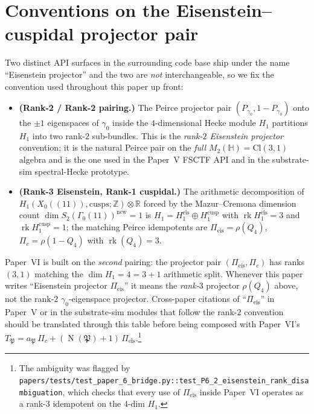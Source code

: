 \documentclass[11pt,a4paper]{article}
\theoremstyle{plain}
\theoremstyle{definition}
\theoremstyle{remark}
\numberwithin{equation}{section}
\providecommand{\Cl}{\mathrm{Cl}}
\providecommand{\HH}{\mathbb{H}}
\providecommand{\ZZ}{\mathbb{Z}}
\providecommand{\RR}{\mathbb{R}}
\providecommand{\fP}{\mathfrak{P}}
\DeclareMathOperator{\Nm}{N}
\DeclareMathOperator{\rk}{rk}
\begin{document}
\section*{Conventions on the Eisenstein--cuspidal projector pair}

\noindent
Two distinct API surfaces in the surrounding code base ship under the
name ``Eisenstein projector'' and the two are \emph{not}
interchangeable, so we fix the convention used throughout this paper
up front:
\begin{itemize}[leftmargin=1.3em]
  \item \textbf{(Rank-2 / Rank-2 pairing.)}
    The Peirce projector pair $(P_{\gamma_0}, 1 - P_{\gamma_0})$ onto
    the $\pm 1$ eigenspaces of $\gamma_0$ inside the
    $4$-dimensional Hecke module $H_1$ partitions $H_1$ into two
    rank-$2$ sub-bundles.  This is the \emph{rank-$2$ Eisenstein
    projector} convention; it is the natural Peirce pair on the
    \emph{full} $M_2(\HH) = \Cl(3,1)$ algebra and is the one used
    in the Paper~V FSCTF API and in the substrate-sim
    spectral-Hecke prototype.
  \item \textbf{(Rank-3 Eisenstein, Rank-1 cuspidal.)}
    The arithmetic decomposition of
    $H_1(X_0((11)), \mathrm{cusps}; \ZZ) \otimes \RR$
    forced by the Mazur--Cremona dimension count
    $\dim S_2(\Gamma_0(11))^{\mathrm{new}} = 1$ is
    $H_1 = H_1^{\mathrm{eis}} \oplus H_1^{\mathrm{cusp}}$ with
    $\rk H_1^{\mathrm{eis}} = 3$ and $\rk H_1^{\mathrm{cusp}} = 1$;
    the matching Peirce idempotents are $\Pi_{\mathrm{eis}} = \rho(Q_4)$,
    $\Pi_c = \rho(1 - Q_4)$ with $\rk(Q_4) = 3$.
\end{itemize}
\noindent
Paper~VI is built on the \emph{second} pairing: the projector pair
$(\Pi_{\mathrm{eis}}, \Pi_c)$ has ranks $(3,1)$ matching the
$\dim H_1 = 4 = 3 + 1$ arithmetic split.  Whenever this paper writes
``Eisenstein projector $\Pi_{\mathrm{eis}}$'' it means the
\emph{rank-$3$} projector $\rho(Q_4)$ above, not the rank-$2$
$\gamma_0$-eigenspace projector.  Cross-paper citations of
``$\Pi_{\mathrm{eis}}$'' in Paper~V or in the substrate-sim modules
that follow the rank-$2$ convention should be translated through this
table before being composed with Paper~VI's
$T_\fP = a_\fP\,\Pi_c + (\Nm(\fP)+1)\,\Pi_{\mathrm{eis}}$.\footnote{The
ambiguity was flagged by
\texttt{papers/tests/test\_paper\_6\_bridge.py::test\_P6\_2\_eisenstein\_rank\_disambiguation},
which checks that every use of $\Pi_{\mathrm{eis}}$ inside Paper~VI
operates as a rank-$3$ idempotent on the 4-dim $H_1$.}
\end{document}
